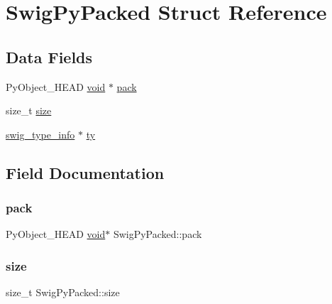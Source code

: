 \hypertarget{struct_swig_py_packed}{}\section{Swig\+Py\+Packed Struct Reference}
\label{struct_swig_py_packed}
\subsection*{Data Fields}
\begin{DoxyCompactItemize}
\item 
Py\+Object\+\_\+\+H\+E\+AD \hyperlink{lp__lib_8h_ac7828c7b2b31d2e11af17bdb6289c5d9}{void} $\ast$ \hyperlink{struct_swig_py_packed_af5122bcb9e73bf2dec4ce5f58f004e1b}{pack}
\item 
size\+\_\+t \hyperlink{struct_swig_py_packed_aed2bfb8fb3c9f804c386215db63921cb}{size}
\item 
\hyperlink{structswig__type__info}{swig\+\_\+type\+\_\+info} $\ast$ \hyperlink{struct_swig_py_packed_aa6f6be0a8a1bff7710200fbe8d51acf0}{ty}
\end{DoxyCompactItemize}


\subsection{Field Documentation}
\mbox{\label{struct_swig_py_packed_af5122bcb9e73bf2dec4ce5f58f004e1b}} 
\subsubsection{\texorpdfstring{pack}{pack}}
{\footnotesize\ttfamily Py\+Object\+\_\+\+H\+E\+AD \hyperlink{lp__lib_8h_ac7828c7b2b31d2e11af17bdb6289c5d9}{void}$\ast$ Swig\+Py\+Packed\+::pack}

\mbox{\label{struct_swig_py_packed_aed2bfb8fb3c9f804c386215db63921cb}} 
\subsubsection{\texorpdfstring{size}{size}}
{\footnotesize\ttfamily size\+\_\+t Swig\+Py\+Packed\+::size}

